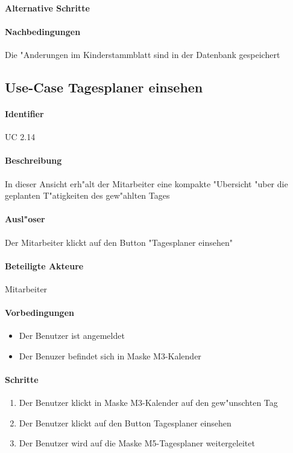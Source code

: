   \paragraph{Alternative Schritte}
  \paragraph{Nachbedingungen}
  Die "Anderungen im Kinderstammblatt sind in der Datenbank gespeichert
  
  
  \newpage
 \subsection{Use-Case Tagesplaner einsehen}
  \paragraph{Identifier}
  UC 2.14
  \paragraph{Beschreibung}
  In dieser Ansicht erh"alt der Mitarbeiter eine kompakte "Ubersicht "uber die geplanten T"atigkeiten des gew"ahlten Tages
  \paragraph{Ausl"oser}
  Der Mitarbeiter klickt auf den Button "Tagesplaner einsehen"
  \paragraph{Beteiligte Akteure}   \leavevmode \newline
    Mitarbeiter
  \paragraph{Vorbedingungen}
  \begin{itemize}
   \item Der Benutzer ist angemeldet
   \item Der Benuzer befindet sich in Maske M3-Kalender
  \end{itemize}

  \paragraph{Schritte}
  \begin{enumerate}
   \item Der Benutzer klickt in Maske M3-Kalender auf den gew"unschten Tag
   \item Der Benutzer klickt auf den Button \dq Tagesplaner einsehen\dq
   \item Der Benutzer wird auf die Maske M5-Tagesplaner weitergeleitet
  \end{enumerate}

